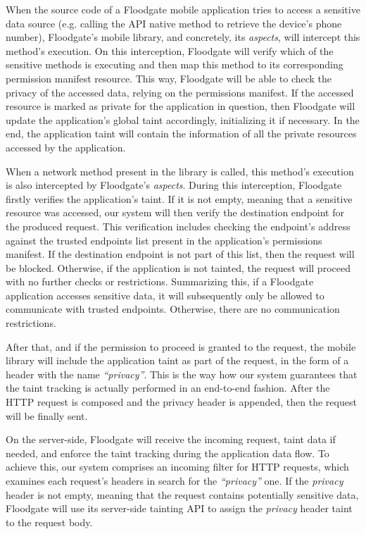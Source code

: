 When the source code of a Floodgate mobile application tries to access a sensitive data source (e.g. calling the API native method to retrieve the device's phone number), Floodgate's mobile library, and concretely, its \textit{aspects}, will intercept this method's execution. On this interception, Floodgate will verify which of the sensitive methods is executing and then map this method to its corresponding permission manifest resource. This way, Floodgate will be able to check the privacy of the accessed data, relying on the permissions manifest. If the accessed resource is marked as private for the application in question, then Floodgate will update the application's global taint accordingly, initializing it if necessary. In the end, the application taint will contain the information of all the private resources accessed by the application.

When a network method present in the library is called, this method's execution is also intercepted by Floodgate's \textit{aspects}. During this interception, Floodgate firstly verifies the application's taint. If it is not empty, meaning that a sensitive resource was accessed, our system will then verify the destination endpoint for the produced request. This verification includes checking the endpoint's address against the trusted endpoints list present in the application's permissions manifest. If the destination endpoint is not part of this list, then the request will be blocked. Otherwise, if the application is not tainted, the request will proceed with no further checks or restrictions. Summarizing this, if a Floodgate application accesses sensitive data, it will subsequently only be allowed to communicate with trusted endpoints. Otherwise, there are no communication restrictions.

After that, and if the permission to proceed is granted to the request, the mobile library will include the application taint as part of the request, in the form of a header with the name \textit{``privacy''}. This is the way how our system guarantees that the taint tracking is actually performed in an end-to-end fashion. After the HTTP request is composed and the privacy header is appended, then the request will be finally sent.

On the server-side, Floodgate will receive the incoming request, taint data if needed, and enforce the taint tracking during the application data flow. To achieve this, our system comprises an incoming filter for HTTP requests, which examines each request's headers in search for the \textit{``privacy''} one. If the \textit{privacy} header is not empty, meaning that the request contains potentially sensitive data, Floodgate will use its server-side tainting API to assign the \textit{privacy} header taint to the request body.

